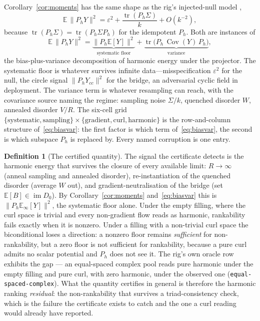\documentclass[11pt,a4paper]{article}
\theoremstyle{definition}
\newtheorem{definition}{Definition}
\theoremstyle{remark}
\newcommand{\im}{\operatorname{im}}
\newcommand{\Cov}{\operatorname{Cov}}
\newcommand{\tr}{\operatorname{tr}}
\newcommand{\Ph}{P_h}
\begin{document}
Corollary~\ref{cor:moments} has the same shape as the rig's injected-null model \cite[\S5]{bradsher2026},
\[
\mathbb{E}\,\|\Ph Y\|^2
=
\varepsilon^2+\frac{\tr(\Ph\Sigma)}{k}+O(k^{-2}),
\]
because $\tr(\Ph\Sigma)=\tr(\Ph\Sigma\Ph)$ for the idempotent $\Ph$. Both are instances of
\begin{equation}
\mathbb{E}\,\|\Ph Y\|^2
=
\underbrace{\|\Ph\mathbb{E}[Y]\|^2}_{\text{systematic floor}}
+
\underbrace{\tr\!\bigl(\Ph\,\Cov(Y)\,\Ph\bigr)}_{\text{variance}},
\label{eq:biasvar}
\end{equation}
the bias-plus-variance decomposition of harmonic energy under the projector. The systematic floor is whatever survives infinite data---misspecification $\varepsilon^2$ for the null, the circle signal $\|\Ph Y_{cc}\|^2$ for the bridge, an adversarial cyclic field in deployment. The variance term is whatever resampling can reach, with the covariance source naming the regime: sampling noise $\Sigma/k$, quenched disorder $W$, annealed disorder $V/R$. The six-cell grid $\{\text{systematic},\text{sampling}\}\times\{\text{gradient},\text{curl},\text{harmonic}\}$ is the row-and-column structure of~\eqref{eq:biasvar}: the first factor is which term of~\eqref{eq:biasvar}, the second is which subspace $\Ph$ is replaced by. Every named corruption is one entry.

\begin{definition}[The certified quantity]\label{def:certified}
The signal the certificate detects is the harmonic energy that survives the closure of every available limit: $R\to\infty$ (anneal sampling and annealed disorder), re-instantiation of the quenched disorder (average $W$ out), and gradient-neutralisation of the bridge (set $\mathbb{E}[B]\in\im D_0$). By Corollary~\ref{cor:moments} and~\eqref{eq:biasvar} this is $\|\Ph\mathbb{E}_{\infty}[Y]\|^2$, the systematic floor alone. Under the empty filling, where the curl space is trivial and every non-gradient flow reads as harmonic, rankability fails exactly when it is nonzero. Under a filling with a non-trivial curl space the biconditional loses a direction: a nonzero floor remains \emph{sufficient} for non-rankability, but a zero floor is not sufficient for rankability, because a pure curl admits no scalar potential and $\Ph$ does not see it. The rig's own oracle row exhibits the gap --- an equal-spaced complex pool reads pure harmonic under the empty filling and pure curl, with zero harmonic, under the observed one (\texttt{equal-spaced-complex}). What the quantity certifies in general is therefore the harmonic ranking \emph{residual}: the non-rankability that survives a triad-consistency check, which is the failure the certificate exists to catch and the one a curl reading would already have reported.
\end{definition}
\end{document}
